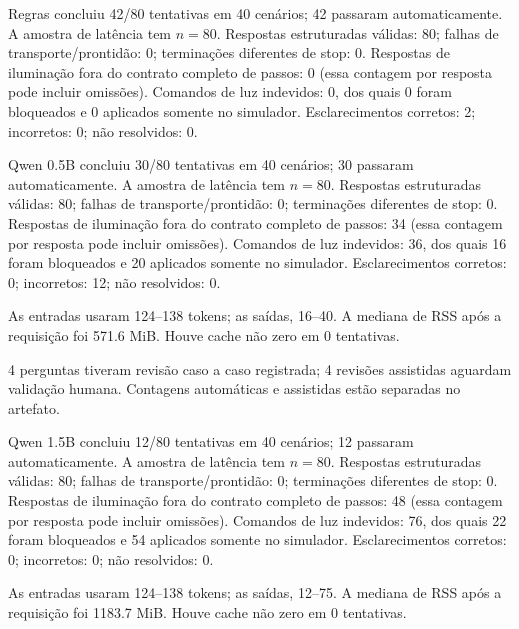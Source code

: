 Regras concluiu 42/80 tentativas em 40 cenários; 42 passaram automaticamente. A amostra de latência tem $n=80$. Respostas estruturadas válidas: 80; falhas de transporte/prontidão: 0; terminações diferentes de stop: 0. Respostas de iluminação fora do contrato completo de passos: 0 (essa contagem por resposta pode incluir omissões). Comandos de luz indevidos: 0, dos quais 0 foram bloqueados e 0 aplicados somente no simulador. Esclarecimentos corretos: 2; incorretos: 0; não resolvidos: 0.

Qwen 0.5B concluiu 30/80 tentativas em 40 cenários; 30 passaram automaticamente. A amostra de latência tem $n=80$. Respostas estruturadas válidas: 80; falhas de transporte/prontidão: 0; terminações diferentes de stop: 0. Respostas de iluminação fora do contrato completo de passos: 34 (essa contagem por resposta pode incluir omissões). Comandos de luz indevidos: 36, dos quais 16 foram bloqueados e 20 aplicados somente no simulador. Esclarecimentos corretos: 0; incorretos: 12; não resolvidos: 0.

As entradas usaram 124--138 tokens; as saídas, 16--40. A mediana de RSS após a requisição foi 571.6 MiB. Houve cache não zero em 0 tentativas.

4 perguntas tiveram revisão caso a caso registrada; 4 revisões assistidas aguardam validação humana. Contagens automáticas e assistidas estão separadas no artefato.

Qwen 1.5B concluiu 12/80 tentativas em 40 cenários; 12 passaram automaticamente. A amostra de latência tem $n=80$. Respostas estruturadas válidas: 80; falhas de transporte/prontidão: 0; terminações diferentes de stop: 0. Respostas de iluminação fora do contrato completo de passos: 48 (essa contagem por resposta pode incluir omissões). Comandos de luz indevidos: 76, dos quais 22 foram bloqueados e 54 aplicados somente no simulador. Esclarecimentos corretos: 0; incorretos: 0; não resolvidos: 0.

As entradas usaram 124--138 tokens; as saídas, 12--75. A mediana de RSS após a requisição foi 1183.7 MiB. Houve cache não zero em 0 tentativas.
